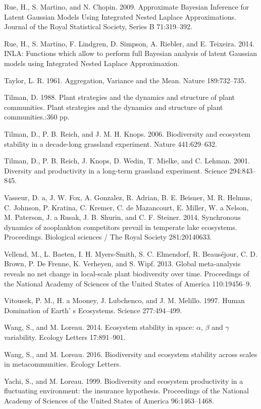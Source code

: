 \documentclass[12pt,]{article}
\begin{document}
Rue, H., S. Martino, and N. Chopin. 2009. Approximate Bayesian Inference
for Latent Gaussian Models Using Integrated Nested Laplace
Approximations. Journal of the Royal Statistical Society, Series B
71:319--392.

Rue, H., S. Martino, F. Lindgren, D. Simpson, A. Riebler, and E.
Teixeira. 2014. INLA: Functions which allow to perform full Bayesian
analysis of latent Gaussian models using Integrated Nested Laplace
Approximaxion.

Taylor, L. R. 1961. Aggregation, Variance and the Mean. Nature
189:732--735.

Tilman, D. 1988. Plant strategies and the dynamics and structure of
plant communities. Plant strategies and the dynamics and structure of
plant communities.:360 pp.

Tilman, D., P. B. Reich, and J. M. H. Knops. 2006. Biodiversity and
ecosystem stability in a decade-long grassland experiment. Nature
441:629--632.

Tilman, D., P. B. Reich, J. Knops, D. Wedin, T. Mielke, and C. Lehman.
2001. Diversity and productivity in a long-term grassland experiment.
Science 294:843--845.

Vasseur, D. a, J. W. Fox, A. Gonzalez, R. Adrian, B. E. Beisner, M. R.
Helmus, C. Johnson, P. Kratina, C. Kremer, C. de Mazancourt, E. Miller,
W. a Nelson, M. Paterson, J. a Rusak, J. B. Shurin, and C. F. Steiner.
2014. Synchronous dynamics of zooplankton competitors prevail in
temperate lake ecosystems. Proceedings. Biological sciences / The Royal
Society 281:20140633.

Vellend, M., L. Baeten, I. H. Myers-Smith, S. C. Elmendorf, R.
Beauséjour, C. D. Brown, P. {De Frenne}, K. Verheyen, and S. Wipf. 2013.
Global meta-analysis reveals no net change in local-scale plant
biodiversity over time. Proceedings of the National Academy of Sciences
of the United States of America 110:19456--9.

Vitousek, P. M., H. a Mooney, J. Lubchenco, and J. M. Melillo. 1997.
Human Domination of Earth' s Ecosystems. Science 277:494--499.

Wang, S., and M. Loreau. 2014. Ecosystem stability in space: \(\alpha\),
\(\beta\) and \(\gamma\) variability. Ecology Letters 17:891--901.

Wang, S., and M. Loreau. 2016. Biodiversity and ecosystem stability
across scales in metacommunities. Ecology Letters.

Yachi, S., and M. Loreau. 1999. Biodiversity and ecosystem productivity
in a fluctuating environment: the insurance hypothesis. Proceedings of
the National Academy of Sciences of the United States of America
96:1463--1468.
\end{document}
